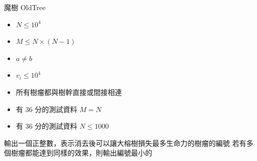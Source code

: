 \begin{problem}{魔樹 OldTree}
\begin{iofmt}
\begin{itemize}
	\item $N \leq 10^4$
	\item $M \leq N \times (N-1)$
	\item $a\neq b$
	\item $v_i \leq 10^4$
	\item 所有樹瘤都與樹幹直接或間接相連
	\item 有 36 分的測試資料 $M = N$
	\item 有 36 分的測試資料 $N \leq 1000$
\end{itemize}
\end{iofmt}

\OutputFile

輸出一個正整數，表示消去後可以讓大榕樹損失最多生命力的樹瘤的編號 \newline
若有多個樹瘤都能達到同樣的效果，則輸出編號最小的 \newline

\Examples

\begin{example}
%
%
\end{example}


\end{problem}
